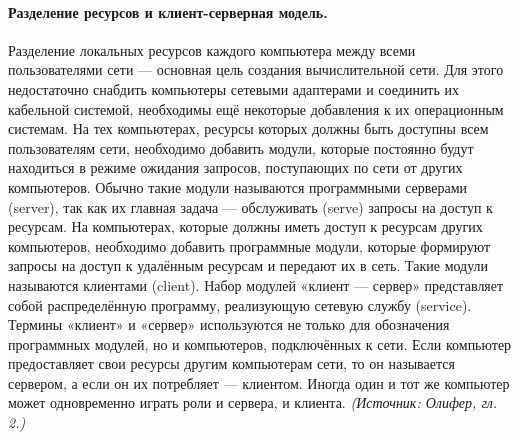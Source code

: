 \documentclass[a4paper,12pt]{article}
\begin{document}
\paragraph{Разделение ресурсов и клиент-серверная модель.}
Разделение локальных ресурсов каждого компьютера между всеми пользователями сети — основная цель создания вычислительной сети. Для этого недостаточно снабдить компьютеры сетевыми адаптерами и соединить их кабельной системой, необходимы ещё некоторые добавления к их операционным системам. На тех компьютерах, ресурсы которых должны быть доступны всем пользователям сети, необходимо добавить модули, которые постоянно будут находиться в режиме ожидания запросов, поступающих по сети от других компьютеров. Обычно такие модули называются программными серверами (server), так как их главная задача — обслуживать (serve) запросы на доступ к ресурсам. На компьютерах, которые должны иметь доступ к ресурсам других компьютеров, необходимо добавить программные модули, которые формируют запросы на доступ к удалённым ресурсам и передают их в сеть. Такие модули называются клиентами (client). Набор модулей «клиент — сервер» представляет собой распределённую программу, реализующую сетевую службу (service). Термины «клиент» и «сервер» используются не только для обозначения программных модулей, но и компьютеров, подключённых к сети. Если компьютер предоставляет свои ресурсы другим компьютерам сети, то он называется сервером, а если он их потребляет — клиентом. Иногда один и тот же компьютер может одновременно играть роли и сервера, и клиента.
\textit{(Источник: Олифер, гл. 2.)}
\end{document}
